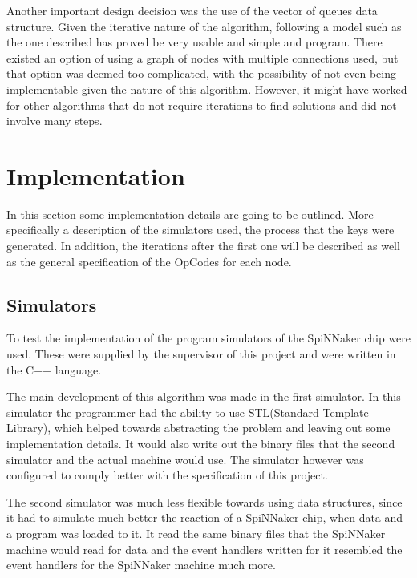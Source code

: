 \documentclass[12pt,a4paper]{article}
\begin{document}
Another important design decision was the use of the vector of queues data structure. Given the iterative nature of the algorithm, following a model such as the one described has proved be very usable and simple and program. There existed an option of using a graph of nodes with multiple connections used, but that option was deemed too complicated, with the possibility of not even being implementable given the nature of this algorithm. However, it might have worked for other algorithms that do not require iterations to find solutions and did not involve many steps.
\section{Implementation}
In this section some implementation details are going to be outlined. More specifically a description of the simulators used, the process that the keys were generated. In addition, the iterations after the first one will be described as well as the general specification of the OpCodes for each node.
\subsection{Simulators}
To test the implementation of the program simulators of the SpiNNaker chip were used. These were supplied by the supervisor of this project and were written in the C++ language. 

The main development of this algorithm was made in the first simulator. In this simulator the programmer had the ability to use STL(Standard Template Library), which helped towards abstracting the problem and leaving out some implementation details. It would also write out the binary files that the second simulator and the actual machine would use. The simulator however was configured to comply better with the specification of this project.

The second simulator was much less flexible towards using data structures, since it had to simulate much better the reaction of a SpiNNaker chip, when data and a program was loaded to it. It read the same binary files that the SpiNNaker machine would read for data and the event handlers written for it resembled the event handlers for the SpiNNaker machine much more.
\end{document}
